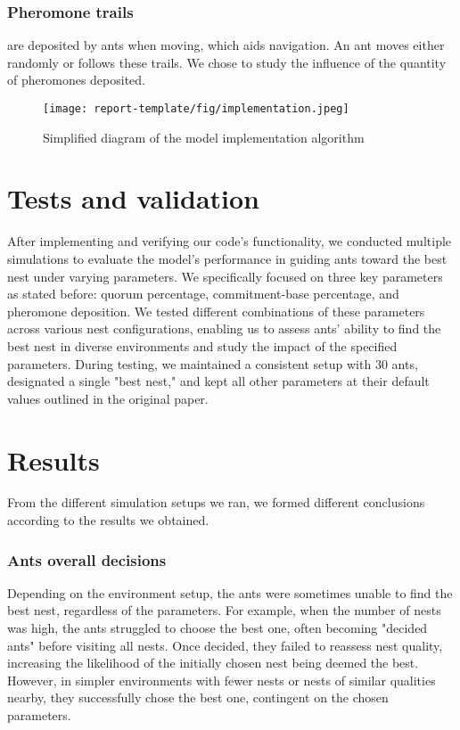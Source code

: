 \documentclass[9pt]{pnas-new}
\begin{document}
\subsubsection*{Pheromone trails} are deposited by ants when moving, which aids navigation. An ant moves either randomly or follows these trails. We chose to study the influence of the quantity of pheromones deposited.\\

\begin{figure}
	\centering
	\texttt{[image: report-template/fig/implementation.jpeg]}
	\caption{Simplified diagram of the model implementation algorithm}
	\label{fig:implementdiag}
\end{figure}
\section*{Tests and validation}
After implementing and verifying our code's functionality, we conducted multiple simulations to evaluate the model's performance in guiding ants toward the best nest under varying parameters. We specifically focused on three key parameters as stated before: quorum percentage, commitment-base percentage, and pheromone deposition. We tested different combinations of these parameters across various nest configurations, enabling us to assess ants' ability to find the best nest in diverse environments and study the impact of the specified parameters. During testing, we maintained a consistent setup with 30 ants, designated a single "best nest," and kept all other parameters at their default values outlined in the original paper.


\section*{Results}
From the different simulation setups we ran, we formed different conclusions according to the results we obtained. 

\subsubsection*{Ants overall decisions}
Depending on the environment setup, the ants were sometimes unable to find the best nest, regardless of the parameters. For example, when the number of nests was high, the ants struggled to choose the best one, often becoming "decided ants" before visiting all nests. Once decided, they failed to reassess nest quality, increasing the likelihood of the initially chosen nest being deemed the best. However, in simpler environments with fewer nests or nests of similar qualities nearby, they successfully chose the best one, contingent on the chosen parameters.
\end{document}
